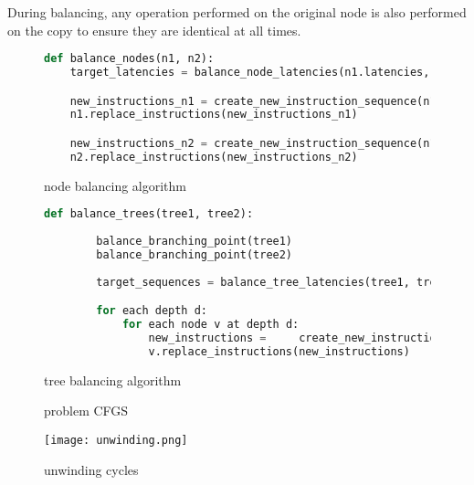 \documentclass{article}
\begin{document}
During balancing, any operation performed on the original node is also performed on the copy to ensure they are identical at all times.


\begin{figure}
	\begin{lstlisting}[language=Python]
	def balance_nodes(n1, n2):
    target_latencies = balance_node_latencies(n1.latencies, n2.latencies)

    new_instructions_n1 = create_new_instruction_sequence(n1.instructions, target_latencies)
    n1.replace_instructions(new_instructions_n1)

    new_instructions_n2 = create_new_instruction_sequence(n1.instructions, target_latencies)
    n2.replace_instructions(new_instructions_n2)
\end{lstlisting}
\caption{node balancing algorithm}
\label{node_balancing}
\end{figure}


\begin{figure}
	\begin{lstlisting}[language=Python]
	def balance_trees(tree1, tree2):
	
		balance_branching_point(tree1)
		balance_branching_point(tree2)
	
		target_sequences = balance_tree_latencies(tree1, tree2)

		for each depth d: 
			for each node v at depth d:
				new_instructions =     create_new_instruction_sequence(v.instructions, target_sequences[d])
    			v.replace_instructions(new_instructions)
\end{lstlisting}
\caption{tree balancing algorithm}
\label{tree_balancing}
\end{figure}


\begin{figure}
\begin{center}
\end{center}

\caption{problem CFGS}
\label{problem_cfg}
\end{figure}



\begin{figure}
\begin{center}
\texttt{[image: unwinding.png]}
\end{center}
\caption{unwinding cycles}
\label{unwinding_cycles}
\end{figure}
\end{document}
